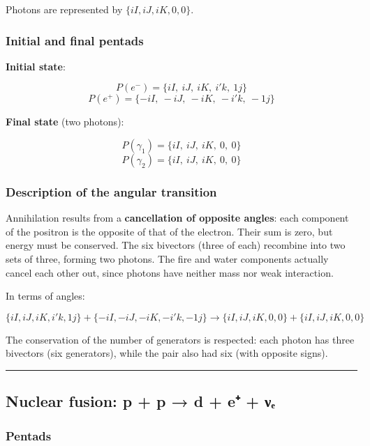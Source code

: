 \documentclass[11pt]{article}
\begin{document}
Photons are represented by \(\{iI, iJ, iK, 0, 0\}\).

\hypertarget{initial-and-final-pentads-1}{%
\subsubsection{Initial and final
pentads}\label{initial-and-final-pentads-1}}

\textbf{Initial state}:

\[
P(e^-) = \{ iI,\ iJ,\ iK,\ i'k,\ 1j \}
\] \[
P(e^+) = \{ -iI,\ -iJ,\ -iK,\ -i'k,\ -1j \}
\]

\textbf{Final state} (two photons):

\[
P(\gamma_1) = \{ iI,\ iJ,\ iK,\ 0,\ 0 \}
\] \[
P(\gamma_2) = \{ iI,\ iJ,\ iK,\ 0,\ 0 \}
\]

\hypertarget{description-of-the-angular-transition-1}{%
\subsubsection{Description of the angular
transition}\label{description-of-the-angular-transition-1}}

Annihilation results from a \textbf{cancellation of opposite angles}:
each component of the positron is the opposite of that of the electron.
Their sum is zero, but energy must be conserved. The six bivectors
(three of each) recombine into two sets of three, forming two photons.
The fire and water components actually cancel each other out, since
photons have neither mass nor weak interaction.

In terms of angles:

\[
\{iI,iJ,iK,i'k,1j\} + \{-iI,-iJ,-iK,-i'k,-1j\} \to \{iI,iJ,iK,0,0\} + \{iI,iJ,iK,0,0\}
\]

The conservation of the number of generators is respected: each photon
has three bivectors (six generators), while the pair also had six (with
opposite signs).

\begin{center}\rule{0.5\linewidth}{0.5pt}\end{center}

\hypertarget{nuclear-fusion-p-p-d-e-ux3bdux2091}{%
\subsection{Nuclear fusion: p + p → d + e⁺ +
νₑ}\label{nuclear-fusion-p-p-d-e-ux3bdux2091}}

\hypertarget{pentads}{%
\subsubsection{Pentads}\label{pentads}}
\end{document}
